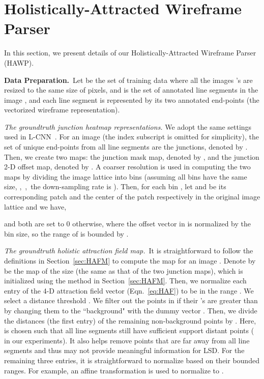 \documentclass[10pt,twocolumn,letterpaper]{article}
\begin{document}
\section{Holistically-Attracted Wireframe Parser}\label{sec:HAWP}
\vspace{-2mm}
In this section, we present details of our Holistically-Attracted Wireframe Parser (HAWP). 

\textbf{Data Preparation.}~Let  be the set of training data where all the images 's are resized to the same size of  pixels, and  is the set of  annotated line segments in the image ,  and each line segment  is represented by its two annotated end-points (the vectorized wireframe representation). 

\textit{The groundtruth junction heatmap representations.} We adopt the same settings used in L-CNN~\cite{ZhouQM19}. 
For an image  (the index  subscript is omitted for simplicity), the set of unique end-points from all line segments are the junctions, denoted by . Then, we create two maps: the junction mask map, denoted by , and the junction 2-D offset map, denoted by . A coarser resolution is used in computing the two maps by dividing the image lattice into  bins (assuming all bins have the same size, ,~\ie,~the down-sampling rate is ). Then, for each bin , let  and  be its corresponding patch and the center of the patch respectively in the original image lattice and we have,   

and both are set to 0 otherwise, where the offset vector in  is normalized by the bin size, so the range of  is bounded by . 


\textit{The groundtruth holistic attraction field map.}~It is straightforward to follow the definitions in Section~\ref{sec:HAFM} to compute the map for an image . Denote by  be the map of the size  (the same as that of the two junction maps), which is initialized using the method in Section~\ref{sec:HAFM}. Then, we normalize each entry of the 4-D attraction field vector (Eqn.~\eqref{eq:HAF}) to be in the range . We select a distance threshold . We filter out the points in  if their 's are greater than  by changing them to the ``background" with the dummy vector . Then, we divide the distances (the first entry) of the remaining non-background points by . Here,  is chosen such that all line segments still have sufficient support distant points ( in our experiments). It also helps remove points that are far away from all line segments and thus may not provide meaningful information for LSD. For the remaining three entries, it is straightforward to normalize based on their bounded ranges. For example, an affine transformation is used to normalize  to .   
\end{document}
